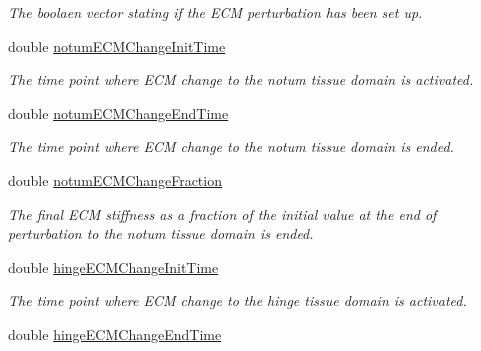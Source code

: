 \begin{DoxyCompactItemize}
\begin{DoxyCompactList}\small\item\em The boolaen vector stating if the E\+C\+M perturbation has been set up. \end{DoxyCompactList}\item 
\hypertarget{classSimulation_a3dc8a1c0e41aa8cde9865604b27a4226}{}double \hyperlink{classSimulation_a3dc8a1c0e41aa8cde9865604b27a4226}{notum\+E\+C\+M\+Change\+Init\+Time}\label{classSimulation_a3dc8a1c0e41aa8cde9865604b27a4226}

\begin{DoxyCompactList}\small\item\em The time point where E\+C\+M change to the notum tissue domain is activated. \end{DoxyCompactList}\item 
\hypertarget{classSimulation_a45f2a57f59d39995424b7c32ae11fa8c}{}double \hyperlink{classSimulation_a45f2a57f59d39995424b7c32ae11fa8c}{notum\+E\+C\+M\+Change\+End\+Time}\label{classSimulation_a45f2a57f59d39995424b7c32ae11fa8c}

\begin{DoxyCompactList}\small\item\em The time point where E\+C\+M change to the notum tissue domain is ended. \end{DoxyCompactList}\item 
\hypertarget{classSimulation_ade4797ce6928843e8871f25adea46f6e}{}double \hyperlink{classSimulation_ade4797ce6928843e8871f25adea46f6e}{notum\+E\+C\+M\+Change\+Fraction}\label{classSimulation_ade4797ce6928843e8871f25adea46f6e}

\begin{DoxyCompactList}\small\item\em The final E\+C\+M stiffness as a fraction of the initial value at the end of perturbation to the notum tissue domain is ended. \end{DoxyCompactList}\item 
\hypertarget{classSimulation_ae6491c62b99ae31c0a5bd2b5e3383bfd}{}double \hyperlink{classSimulation_ae6491c62b99ae31c0a5bd2b5e3383bfd}{hinge\+E\+C\+M\+Change\+Init\+Time}\label{classSimulation_ae6491c62b99ae31c0a5bd2b5e3383bfd}

\begin{DoxyCompactList}\small\item\em The time point where E\+C\+M change to the hinge tissue domain is activated. \end{DoxyCompactList}\item 
\hypertarget{classSimulation_a1dac775eb4843f0cf562aa574664a14f}{}double \hyperlink{classSimulation_a1dac775eb4843f0cf562aa574664a14f}{hinge\+E\+C\+M\+Change\+End\+Time}\label{classSimulation_a1dac775eb4843f0cf562aa574664a14f}


\end{DoxyCompactItemize}
